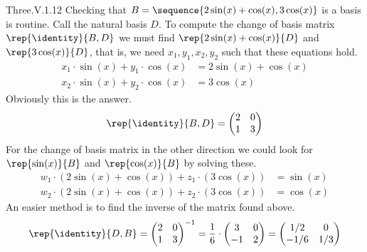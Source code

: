 \begin{ans}{Three.V.1.12}
      Checking that \( B=\sequence{2\sin(x)+\cos(x),3\cos(x)} \) is a basis
      is routine.
      Call the natural basis $D$.
      To compute the change of basis matrix $\rep{\identity}{B,D}$ we must
      find $\rep{2\sin(x)+\cos(x)}{D}$ and $\rep{3\cos(x)}{D}$, that is,
      we need $x_1,y_1, x_2,y_2$ such that these equations hold.
      \begin{align*}
        x_1\cdot \sin(x)+y_1\cdot\cos(x) &= 2\sin(x)+\cos(x) \\
        x_2\cdot \sin(x)+y_2\cdot\cos(x) &= 3\cos(x)
      \end{align*}
      Obviously this is the answer.
      \begin{equation*}
        \rep{\identity}{B,D}
        =\begin{pmatrix}
          2  &0  \\
          1  &3
        \end{pmatrix}
      \end{equation*}
      For the change of basis matrix in the other direction we could
      look for $\rep{\sin(x)}{B}$ and $\rep{\cos(x)}{B}$ by solving these.
      \begin{align*}
        w_1\cdot (2\sin(x)+\cos(x))+z_1\cdot(3\cos(x)) &= \sin(x) \\
        w_2\cdot (2\sin(x)+\cos(x))+z_2\cdot(3\cos(x)) &= \cos(x)
      \end{align*}
      An easier method is to find the inverse of the matrix found above.
      \begin{equation*}
        \rep{\identity}{D,B}
        =\begin{pmatrix}
          2  &0  \\
          1  &3
        \end{pmatrix}^{-1}
        =\frac{1}{6}\cdot\begin{pmatrix}
          3  &0  \\
          -1  &2
        \end{pmatrix}
        =\begin{pmatrix}
           1/2  &0  \\
          -1/6  &1/3
         \end{pmatrix}
      \end{equation*}
    
\end{ans}
